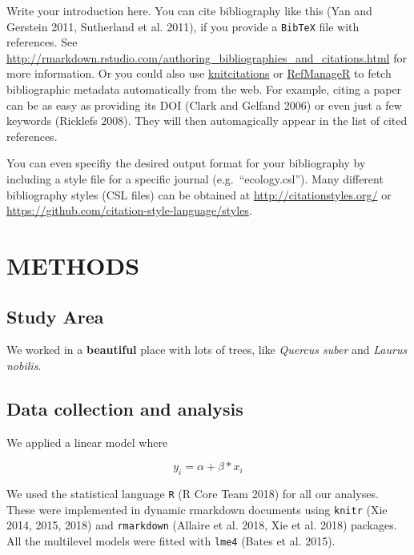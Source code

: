 \documentclass[11pt,a4paper]{article}
\begin{document}
Write your introduction here. You can cite bibliography like this (Yan
and Gerstein 2011, Sutherland et al. 2011), if you provide a
\texttt{BibTeX} file with references. See
\url{http://rmarkdown.rstudio.com/authoring_bibliographies_and_citations.html}
for more information. Or you could also use
\href{https://cran.r-project.org/web/packages/knitcitations/index.html}{knitcitations}
or
\href{https://cran.r-project.org/web/packages/RefManageR/index.html}{RefManageR}
to fetch bibliographic metadata automatically from the web. For example,
citing a paper can be as easy as providing its DOI (Clark and Gelfand
2006) or even just a few keywords (Ricklefs 2008). They will then
automagically appear in the list of cited references.

You can even specifiy the desired output format for your bibliography by
including a style file for a specific journal (e.g.~``ecology.csl'').
Many different bibliography styles (CSL files) can be obtained at
\url{http://citationstyles.org/} or
\url{https://github.com/citation-style-language/styles}.

\hypertarget{methods}{%
\section{METHODS}\label{methods}}

\hypertarget{study-area}{%
\subsection{Study Area}\label{study-area}}

We worked in a \textbf{beautiful} place with lots of trees, like
\emph{Quercus suber} and \emph{Laurus nobilis}.

\hypertarget{data-collection-and-analysis}{%
\subsection{Data collection and
analysis}\label{data-collection-and-analysis}}

We applied a linear model where

\[
y_{i} = \alpha + \beta*x_{i} 
\]

We used the statistical language \texttt{R} (R Core Team 2018) for all
our analyses. These were implemented in dynamic rmarkdown documents
using \texttt{knitr} (Xie 2014, 2015, 2018) and \texttt{rmarkdown}
(Allaire et al. 2018, Xie et al. 2018) packages. All the multilevel
models were fitted with \texttt{lme4} (Bates et al. 2015).
\end{document}
